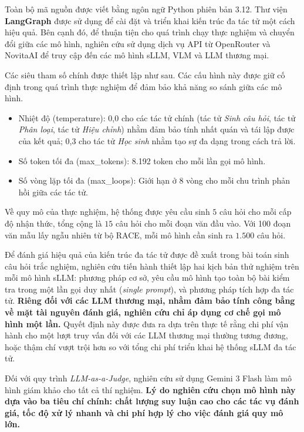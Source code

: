 Toàn bộ mã nguồn được viết bằng ngôn ngữ Python phiên bản 3.12. Thư viện \textbf{LangGraph} \cite{langgraph2024} được sử dụng để cài đặt và triển khai kiến trúc đa tác tử một cách hiệu quả. Bên cạnh đó, để thuận tiện cho quá trình chạy thực nghiệm và chuyển đổi giữa các mô hình, nghiên cứu sử dụng dịch vụ API từ OpenRouter \cite{openrouter} và NovitaAI \cite{novitaai} để truy cập đến các mô hình sLLM, VLM và LLM thương mại.

Các siêu tham số chính được thiết lập như sau. Các cấu hình này được giữ cố định trong quá trình thực nghiệm để đảm bảo khả năng so sánh giữa các mô hình.
\begin{itemize}
    \item Nhiệt độ (temperature): 0,0 cho các tác tử chính (tác tử \textit{Sinh câu hỏi}, tác tử \textit{Phân loại}, tác tử \textit{Hiệu chỉnh}) nhằm đảm bảo tính nhất quán và tái lập được của kết quả; 0,3 cho tác tử \textit{Học sinh} nhằm tạo sự đa dạng trong cách trả lời.
    \item Số token tối đa (max\_tokens): 8.192 token cho mỗi lần gọi mô hình.
    \item Số vòng lặp tối đa (max\_loops): Giới hạn ở 8 vòng cho mỗi chu trình phản hồi giữa các tác tử.
\end{itemize}

Về quy mô của thực nghiệm, hệ thống được yêu cầu sinh $5$ câu hỏi cho mỗi cấp độ nhận thức, tổng cộng là $15$ câu hỏi cho mỗi đoạn văn đầu vào. Với 100 đoạn văn mẫu lấy ngẫu nhiên từ bộ RACE, mỗi mô hình cần sinh ra $1.500$ câu hỏi.

Để đánh giá hiệu quả của kiến trúc đa tác tử được đề xuất trong bài toán sinh câu hỏi trắc nghiệm, nghiên cứu tiến hành thiết lập hai kịch bản thử nghiệm trên mỗi mô hình sLLM: phương pháp cơ sở, yêu cầu mô hình tạo toàn bộ bài kiểm tra trong một lần gọi duy nhất (\textit{single prompt}), và phương pháp tích hợp đa tác tử. \textbf{Riêng đối với các LLM thương mại, nhằm đảm bảo tính công bằng về mặt tài nguyên đánh giá, nghiên cứu chỉ áp dụng cơ chế gọi mô hình một lần.} Quyết định này được đưa ra dựa trên thực tế rằng chi phí vận hành cho một lượt truy vấn đối với các LLM thương mại thường tương đương, hoặc thậm chí vượt trội hơn so với tổng chi phí triển khai hệ thống sLLM đa tác tử.

Đối với quy trình \textit{LLM-as-a-Judge}, nghiên cứu sử dụng Gemini 3 Flash làm mô hình giám khảo cho tất cả thí nghiệm. \textbf{Lý do nghiên cứu chọn mô hình này dựa vào ba tiêu chí chính: chất lượng suy luận cao cho các tác vụ đánh giá, tốc độ xử lý nhanh và chi phí hợp lý cho việc đánh giá quy mô lớn.}

